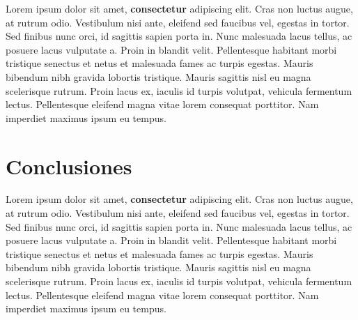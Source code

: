 Lorem ipsum dolor sit amet, \textbf{consectetur} adipiscing elit. Cras non luctus augue, at rutrum odio. Vestibulum nisi ante, eleifend sed faucibus vel, egestas in tortor. Sed finibus nunc orci, id sagittis sapien porta in. Nunc malesuada lacus tellus, ac posuere lacus vulputate a. Proin in blandit velit. Pellentesque habitant morbi tristique senectus et netus et malesuada fames ac turpis egestas. Mauris bibendum nibh gravida lobortis tristique. Mauris sagittis nisl eu magna scelerisque rutrum. Proin lacus ex, iaculis id turpis volutpat, vehicula fermentum lectus. Pellentesque eleifend magna vitae lorem consequat porttitor. Nam imperdiet maximus ipsum eu tempus.

\section{Conclusiones}

Lorem ipsum dolor sit amet, \textbf{consectetur} adipiscing elit. Cras non luctus augue, at rutrum odio. Vestibulum nisi ante, eleifend sed faucibus vel, egestas in tortor. Sed finibus nunc orci, id sagittis sapien porta in. Nunc malesuada lacus tellus, ac posuere lacus vulputate a. Proin in blandit velit. Pellentesque habitant morbi tristique senectus et netus et malesuada fames ac turpis egestas. Mauris bibendum nibh gravida lobortis tristique. Mauris sagittis nisl eu magna scelerisque rutrum. Proin lacus ex, iaculis id turpis volutpat, vehicula fermentum lectus. Pellentesque eleifend magna vitae lorem consequat porttitor. Nam imperdiet maximus ipsum eu tempus.



\newpage


